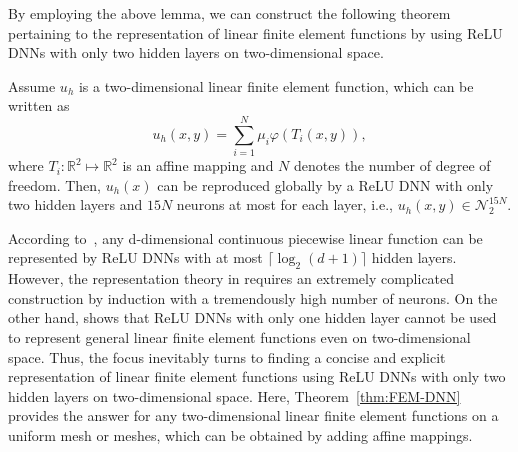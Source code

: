 By employing the above lemma, we can construct the following theorem pertaining to the representation
of linear finite element functions by using ReLU DNNs with only two hidden layers on
two-dimensional space.
\begin{theorem}\label{thm:FEM-DNN}
	Assume $u_h$ is a two-dimensional linear finite element function, which can be written as
	\begin{equation}\label{key}
		u_h(x,y) = \sum_{i=1}^N \mu_i \varphi(T_i(x,y)), 
	\end{equation}
	where $T_i : \mathbb{R}^2 \mapsto \mathbb{R}^2$ is an affine mapping and $N$ denotes
	the number of degree of freedom. Then, $u_h(x)$ 
	can be reproduced globally by a ReLU DNN with only two hidden layers and $15N$ neurons
	at most for each layer, i.e., $u_h(x,y)  \in {\mathcal N}_2^{15N}$.
\end{theorem}
According to~\cite{arora2018understanding}, any d-dimensional continuous piecewise
linear function can be represented by ReLU DNNs with at most $\lceil \log_2(d+1) \rceil$ hidden layers.
However, the representation theory in \cite{arora2018understanding} requires an extremely complicated
construction by induction with a tremendously high number of neurons. On the other hand, \cite{he2020relu}
shows that ReLU DNNs with only one hidden layer cannot be used to represent general linear
finite element functions even on two-dimensional space. 
Thus, the focus inevitably turns to finding
a concise and explicit representation of linear finite element functions using ReLU DNNs with 
only two hidden layers on two-dimensional space. 
Here, Theorem~\ref{thm:FEM-DNN} provides the answer for any two-dimensional linear finite element functions on a uniform mesh or meshes, which can be obtained by adding affine mappings.